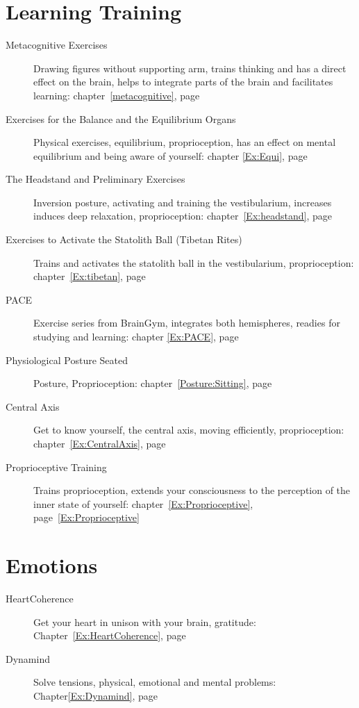 \documentclass[../main.tex]{subfiles}
\begin{document}
\section{Learning Training}
\begin{description} 
\item[Metacognitive Exercises] Drawing figures without supporting arm, trains thinking and has a direct effect on the brain, helps to integrate parts of the brain and facilitates learning: chapter~\ref{metacognitive}, page~\pageref{metacognitive}
\item[Exercises for the Balance and the Equilibrium Organs] Physical exercises, equilibrium, proprioception, has an effect on mental equilibrium and being aware of yourself: chapter \ref{Ex:Equi}, page~\pageref{Ex:Equi}
\item[The Headstand and Preliminary Exercises] Inversion posture, activating and training the vestibularium, increases induces deep relaxation, proprioception: chapter~\ref{Ex:headstand}, page~\pageref{Ex:headstand}
\item[Exercises to Activate the Statolith Ball (Tibetan Rites)] Trains and activates the statolith ball in the vestibularium, proprioception:
  chapter~\ref{Ex:tibetan}, page~\pageref{Ex:tibetan}
\item[PACE] Exercise series from BrainGym, integrates both hemispheres, readies for studying and learning: chapter \ref{Ex:PACE}, page \pageref{Ex:PACE}
\item[Physiological Posture Seated] Posture, Proprioception: chapter~\ref{Posture:Sitting}, page~\pageref{Posture:Sitting}
\item[Central Axis] Get to know yourself, the central axis, moving efficiently, proprioception: chapter~\ref{Ex:CentralAxis}, page~\pageref{Ex:CentralAxis}
\item[Proprioceptive Training] Trains proprioception, extends your consciousness to the perception of the inner state of yourself: chapter~\ref{Ex:Proprioceptive}, page~\ref{Ex:Proprioceptive}
\end{description}

\section{Emotions}
\begin{description}
\item[HeartCoherence] Get your heart in unison with your brain, gratitude: Chapter~\ref{Ex:HeartCoherence}, page~\pageref{Ex:HeartCoherence}
  \item[Dynamind] Solve tensions, physical, emotional and mental problems: Chapter\ref{Ex:Dynamind}, page ~\pageref{Ex:Dynamind}
\end{description}
\end{document}
